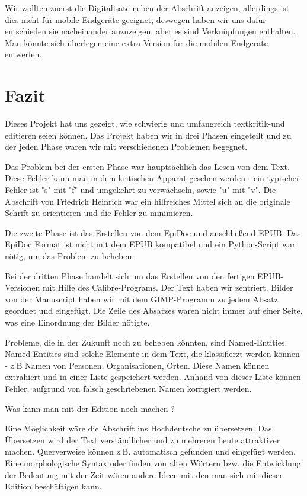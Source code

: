 \documentclass[a4paper, 12pt, oneside]{scrbook}
\begin{document}
Wir wollten zuerst die Digitalisate neben der Abschrift anzeigen, allerdings ist dies nicht für mobile Endgeräte geeignet, deswegen haben wir uns dafür entschieden sie nacheinander anzuzeigen, aber es sind Verknüpfungen enthalten. Man könnte sich überlegen eine extra Version für die mobilen Endgeräte entwerfen.

\chapter{Fazit}

Dieses Projekt hat uns gezeigt, wie schwierig und umfangreich textkritik-und editieren seien können. Das Projekt haben wir in drei Phasen eingeteilt und zu der jeden Phase waren wir mit verschiedenen Problemen begegnet. 

Das Problem bei der ersten Phase war hauptsächlich das Lesen von dem Text. Diese Fehler kann man in dem kritischen Apparat gesehen werden - ein typischer Fehler ist "s" mit "f" und umgekehrt zu verwächseln, sowie "u" mit "v". Die Abschrift von Friedrich Heinrich war ein hilfreiches Mittel sich an die originale Schrift zu orientieren und die Fehler zu minimieren.

Die zweite Phase ist das Erstellen von dem EpiDoc und anschließend EPUB. Das EpiDoc Format ist nicht mit dem EPUB kompatibel und ein Python-Script war nötig, um das Problem zu beheben. 

Bei der dritten Phase handelt sich um das Erstellen von den fertigen EPUB-Versionen mit Hilfe des Calibre-Programs. Der Text haben wir zentriert. Bilder von der Manuscript haben wir mit dem GIMP-Programm zu jedem Absatz geordnet und eingefügt. Die Zeile des Absatzes waren nicht immer auf einer Seite, was eine Einordnung der Bilder nötigte. 

Probleme, die in der Zukunft noch zu beheben könnten, sind Named-Entities. Named-Entities sind solche Elemente in dem Text, die klassifierzt werden können - z.B Namen von Personen, Organisationen, Orten. Diese Namen können extrahiert und in einer Liste gespeichert werden. Anhand von dieser Liste können Fehler, aufgrund von falsch geschriebenen Namen korrigiert werden. 


Was kann man mit der Edition noch machen ? 

Eine Möglichkeit wäre die Abschrift ins Hochdeutsche zu übersetzen. Das Übersetzen wird der Text verständlicher und zu mehreren Leute attraktiver machen. 
Querverweise können z.B. automatisch gefunden und eingefügt werden. Eine morphologische Syntax oder finden von alten Wörtern bzw. die Entwicklung der Bedeutung mit der Zeit wären andere Ideen mit den man sich mit dieser Edition beschäftigen kann. 
 

\printbibliography
\end{document}
